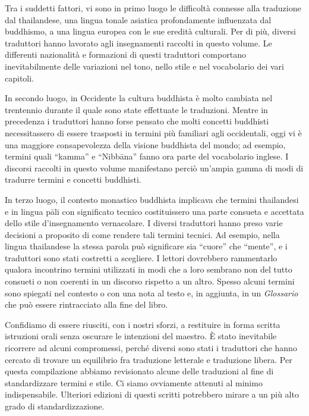 Tra i suddetti fattori, vi sono in primo luogo le difficoltà connesse
alla traduzione dal thailandese, una lingua tonale asiatica
profondamente influenzata dal buddhismo, a una lingua europea con le sue
eredità culturali. Per di più, diversi traduttori hanno lavorato agli
insegnamenti raccolti in questo volume. Le differenti nazionalità e
formazioni di questi traduttori comportano inevitabilmente delle
variazioni nel tono, nello stile e nel vocabolario dei vari capitoli.

In secondo luogo, in Occidente la cultura buddhista è molto cambiata nel
trentennio durante il quale sono state effettuate le traduzioni. Mentre
in precedenza i traduttori hanno forse pensato che molti concetti
buddhisti necessitassero di essere trasposti in termini più familiari
agli occidentali, oggi vi è una maggiore consapevolezza della visione
buddhista del mondo; ad esempio, termini quali ``kamma'' e ``Nibbāna''
fanno ora parte del vocabolario inglese. I discorsi raccolti in questo
volume manifestano perciò un'ampia gamma di modi di tradurre termini e
concetti buddhisti.

In terzo luogo, il contesto monastico buddhista implicava che termini
thailandesi e in lingua pāli con significato tecnico costituissero una
parte consueta e accettata dello stile d'insegnamento vernacolare. I
diversi traduttori hanno preso varie decisioni a proposito di come
rendere tali termini tecnici. Ad esempio, nella lingua thailandese la
stessa parola può significare sia ``cuore'' che ``mente'', e i
traduttori sono stati costretti a scegliere. I lettori dovrebbero
rammentarlo qualora incontrino termini utilizzati in modi che a loro
sembrano non del tutto consueti o non coerenti in un discorso rispetto a
un altro. Spesso alcuni termini sono spiegati nel contesto o con una
nota al testo e, in aggiunta, in un \emph{Glossario} che può essere
rintracciato alla fine del libro.

Confidiamo di essere riusciti, con i nostri sforzi, a restituire in
forma scritta istruzioni orali senza oscurare le intenzioni del maestro.
È stato inevitabile ricorrere ad alcuni compromessi, perché diversi sono
stati i traduttori che hanno cercato di trovare un equilibrio fra
traduzione letterale e traduzione libera. Per questa compilazione
abbiamo revisionato alcune delle traduzioni al fine di standardizzare
termini e stile. Ci siamo ovviamente attenuti al minimo indispensabile.
Ulteriori edizioni di questi scritti potrebbero mirare a un più alto
grado di standardizzazione.

